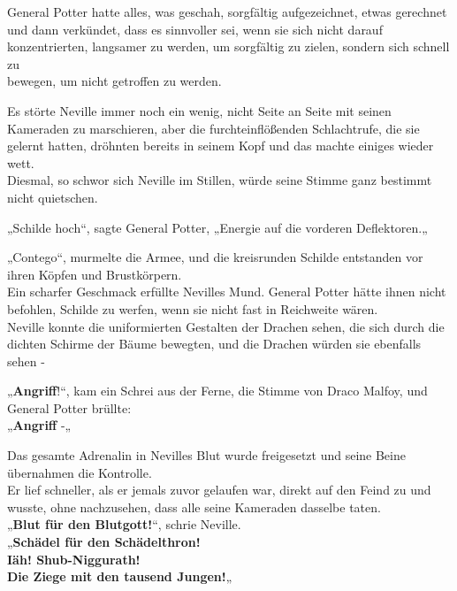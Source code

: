 {General Potter hatte alles, was geschah, sorgfältig aufgezeichnet, etwas gerechnet und dann verkündet, dass es sinnvoller sei, wenn sie sich nicht darauf konzentrierten, langsamer zu werden, um sorgfältig zu zielen, sondern sich schnell zu\\ bewegen, um nicht getroffen zu werden.

Es störte Neville immer noch ein wenig, nicht Seite an Seite mit seinen Kameraden zu marschieren, aber die furchteinflößenden Schlachtrufe, die sie gelernt hatten, dröhnten bereits in seinem Kopf und das machte einiges wieder wett.\\ Diesmal, so schwor sich Neville im Stillen, würde seine Stimme ganz bestimmt nicht quietschen.

„Schilde hoch“, sagte General Potter, „Energie auf die vorderen Deflektoren.„

„Contego“, murmelte die Armee, und die kreisrunden Schilde entstanden vor ihren Köpfen und Brustkörpern.\\ Ein scharfer Geschmack erfüllte Nevilles Mund. General Potter hätte ihnen nicht befohlen, Schilde zu werfen, wenn sie nicht fast in Reichweite wären.\\ Neville konnte die uniformierten Gestalten der Drachen sehen, die sich durch die dichten Schirme der Bäume bewegten, und die Drachen würden sie ebenfalls sehen -

„\textbf{Angriff}!“, kam ein Schrei aus der Ferne, die Stimme von Draco Malfoy, und General Potter brüllte:\\ „\textbf{Angriff} -„

Das gesamte Adrenalin in Nevilles Blut wurde freigesetzt und seine Beine übernahmen die Kontrolle.\\ Er lief schneller, als er jemals zuvor gelaufen war, direkt auf den Feind zu und wusste, ohne nachzusehen, dass alle seine Kameraden dasselbe taten.\\ „\textbf{Blut für den Blutgott!}“, schrie Neville.\\ „\textbf{Schädel für den Schädelthron!}\\ \textbf{Iäh! Shub-Niggurath!}\\ \textbf{Die Ziege mit den tausend Jungen!}„

}
